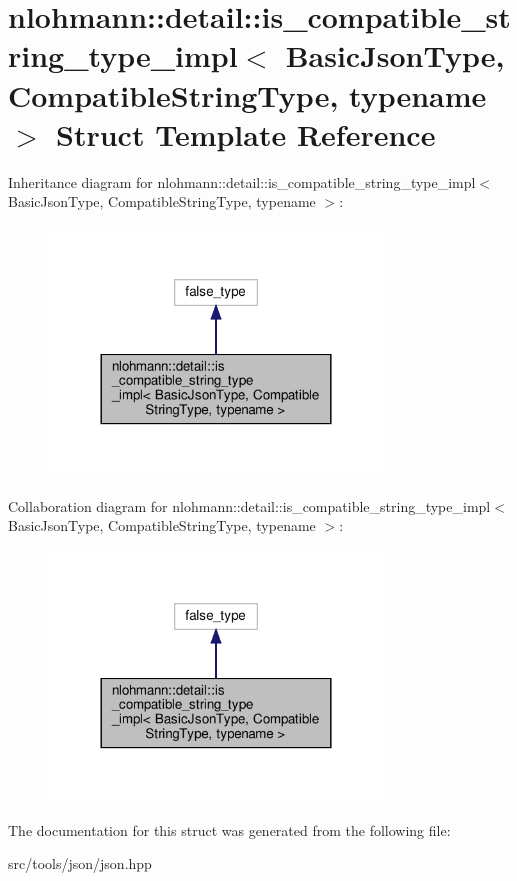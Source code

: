 \hypertarget{structnlohmann_1_1detail_1_1is__compatible__string__type__impl}{}\section{nlohmann\+:\+:detail\+:\+:is\+\_\+compatible\+\_\+string\+\_\+type\+\_\+impl$<$ Basic\+Json\+Type, Compatible\+String\+Type, typename $>$ Struct Template Reference}
\label{structnlohmann_1_1detail_1_1is__compatible__string__type__impl}


Inheritance diagram for nlohmann\+:\+:detail\+:\+:is\+\_\+compatible\+\_\+string\+\_\+type\+\_\+impl$<$ Basic\+Json\+Type, Compatible\+String\+Type, typename $>$\+:
\nopagebreak
\begin{figure}[H]
\begin{center}
\leavevmode
\includegraphics[width=252pt]{structnlohmann_1_1detail_1_1is__compatible__string__type__impl__inherit__graph}
\end{center}
\end{figure}


Collaboration diagram for nlohmann\+:\+:detail\+:\+:is\+\_\+compatible\+\_\+string\+\_\+type\+\_\+impl$<$ Basic\+Json\+Type, Compatible\+String\+Type, typename $>$\+:
\nopagebreak
\begin{figure}[H]
\begin{center}
\leavevmode
\includegraphics[width=252pt]{structnlohmann_1_1detail_1_1is__compatible__string__type__impl__coll__graph}
\end{center}
\end{figure}


The documentation for this struct was generated from the following file\+:\begin{DoxyCompactItemize}
\item 
src/tools/json/json.\+hpp\end{DoxyCompactItemize}
